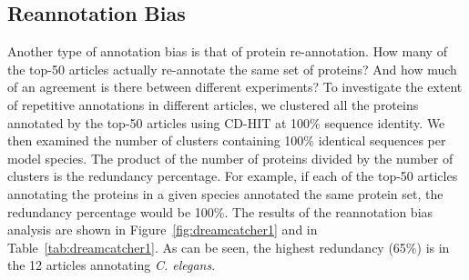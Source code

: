 \documentclass[12pt]{article}
\begin{document}

\subsection*{Reannotation Bias}

Another type of annotation bias is that of protein re-annotation. How many of the top-50 articles
actually re-annotate the same set of proteins? And how much of an agreement is there between
different experiments?  To investigate the extent of repetitive annotations in different articles, we
clustered all the proteins annotated by the top-50 articles using CD-HIT\cite{CD_HIT} at 100\%
sequence identity. We then examined the number of clusters containing 100\% identical sequences per
model species. The product of the number of proteins divided by the number of clusters is the
redundancy percentage. For example, if each of the top-50 articles annotating the proteins in a given
species annotated the same protein set, the redundancy percentage would be 100\%. The results of
the reannotation bias analysis are shown in Figure~\ref{fig:dreamcatcher1} and in
Table~\ref{tab:dreamcatcher1}. As can be seen, the highest redundancy (65\%) is in the 12 articles
annotating \textit{C. elegans}. 
\end{document}
